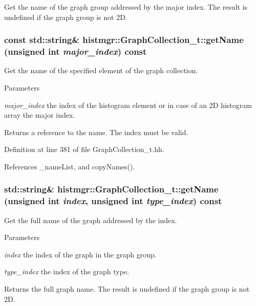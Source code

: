 Get the name of the graph group addressed by the major index. The result is undefined if the graph group is not 2D. 
\subsubsection[{getName}]{\setlength{\rightskip}{0pt plus 5cm}const std::string\& histmgr::GraphCollection\_\-t::getName (unsigned int {\em major\_\-index}) const\hspace{0.3cm}{\ttfamily  [inline]}}\label{classhistmgr_1_1GraphCollection__t_a89505919c7802e21324986f342afe48e}


Get the name of the specified element of the graph collection. 
\begin{DoxyParams}{Parameters}
\item[{\em major\_\-index}]the index of the histogram element or in case of an 2D histogram array the major index. \end{DoxyParams}
\begin{DoxyReturn}{Returns}
a reference to the name. The index must be valid. 
\end{DoxyReturn}


Definition at line 381 of file GraphCollection\_\-t.hh.

References \_\-nameList, and copyNames().
\subsubsection[{getName}]{\setlength{\rightskip}{0pt plus 5cm}std::string\& histmgr::GraphCollection\_\-t::getName (unsigned int {\em index}, \/  unsigned int {\em type\_\-index}) const}\label{classhistmgr_1_1GraphCollection__t_a92a1dd0f7dbd265d4fffc81a7fd77ec6}


Get the full name of the graph addressed by the index. 
\begin{DoxyParams}{Parameters}
\item[{\em index}]the index of the graph in the graph group. \item[{\em type\_\-index}]the index of the graph type. \end{DoxyParams}
\begin{DoxyReturn}{Returns}
the full graph name. The result is undefined if the graph group is not 2D. 
\end{DoxyReturn}
